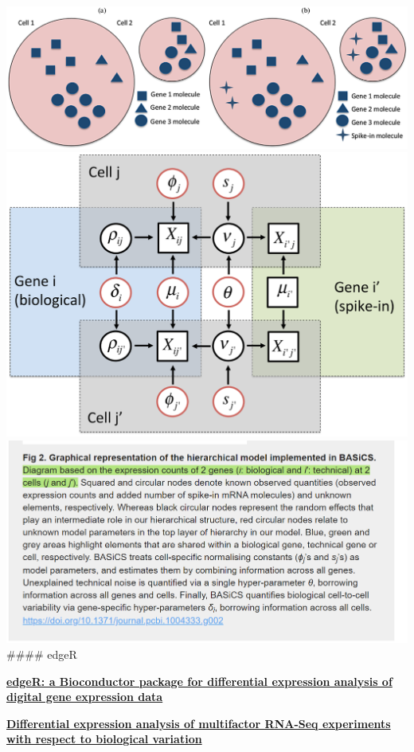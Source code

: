 \documentclass[
]{book}
\begin{document}
\includegraphics{./figs/RNAseqCounts/pcbi.1004333.g001.png}
\includegraphics{./figs/RNAseqCounts/pcbi.1004333.g002.png}
\includegraphics{./figs/RNAseqCounts/BASiCS-FIG2.png}
\#\#\#\# edgeR

\textbf{\href{https://www.ncbi.nlm.nih.gov/pmc/articles/PMC2796818/}{edgeR: a Bioconductor package for differential expression analysis of digital gene expression data}\citep{robinson2010edger}}

\textbf{\href{https://www.ncbi.nlm.nih.gov/pmc/articles/PMC3378882/}{Differential expression analysis of multifactor RNA-Seq experiments with respect to biological variation}\citep{mccarthy2012differential}}
\end{document}
